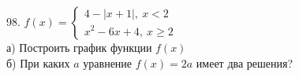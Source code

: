 98. $f(x)=\begin{cases} 4-|x+1|,\ x<2\\ x^2-6x+4,\ x\geqslant 2\end{cases}$\\
а) Построить график функции $f(x)$\\
б) При каких $a$ уравнение $f(x)=2a$ имеет два решения?\\
